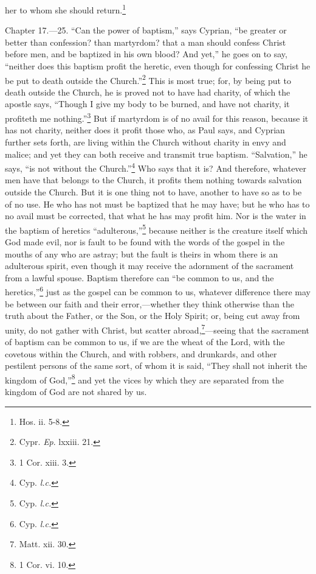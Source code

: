 her to whom she should return.\footnote{\par  Hos. ii. 5-8.}


Chapter 17.—25. ``Can the power of baptism,'' says Cyprian, ``be greater or better than confession? than martyrdom? that a man should confess Christ before men, and be baptized in his own blood? And yet,'' he goes on to say, ``neither does this baptism profit the heretic, even though for confessing Christ he be put to death outside the Church.''\footnote{\par  Cypr. \emph{Ep}. lxxiii. 21.} This is most true; for, by being put to death outside the Church, he is proved not to have had charity, of which the apostle says, ``Though I give my body to be burned, and have not charity, it profiteth me nothing.''\footnote{\par  1 Cor. xiii. 3.} But if martyrdom is of no avail for this reason, because it has not charity, neither does it profit those who, as Paul says, and Cyprian further sets forth, are living within the Church without charity in envy and malice; and yet they can both receive and transmit true baptism. ``Salvation,'' he says, ``is not without the Church.''\footnote{\par  Cyp. \emph{l.c.}} Who says that it is? And therefore, whatever men have that belongs to the Church, it profits them nothing towards salvation outside the Church. But it is one thing not to have, another to have so as to be of no use. He who has not must be baptized that he may have; but he who has to no avail must be corrected, that what he has may profit him. Nor is the water in the baptism of heretics ``adulterous,''\footnote{\par  Cyp. \emph{l.c.}} because neither is the creature itself which God made evil, nor is fault to be found with the words of the gospel in the mouths of any who are astray; but the fault is theirs in whom there is an adulterous spirit, even though it may receive the adornment of the sacrament from a lawful spouse. Baptism therefore can ``be common to us, and the heretics,''\footnote{\par  Cyp. \emph{l.c.}} just as the gospel can be common to us, whatever difference there may be between our faith and their error,—whether they think otherwise than the truth about the Father, or the Son, or the Holy Spirit; or, being cut away from unity, do not gather with Christ, but scatter abroad,\footnote{\par  Matt. xii. 30.}—seeing that the sacrament of baptism can be common to us, if we are the wheat of the Lord, with the covetous within the Church, and with robbers, and drunkards, and other pestilent persons of the same sort, of whom it is said, ``They shall not inherit the kingdom of God,''\footnote{\par  1 Cor. vi. 10.} and yet the vices by which they are separated from the kingdom of God are not shared by us.

